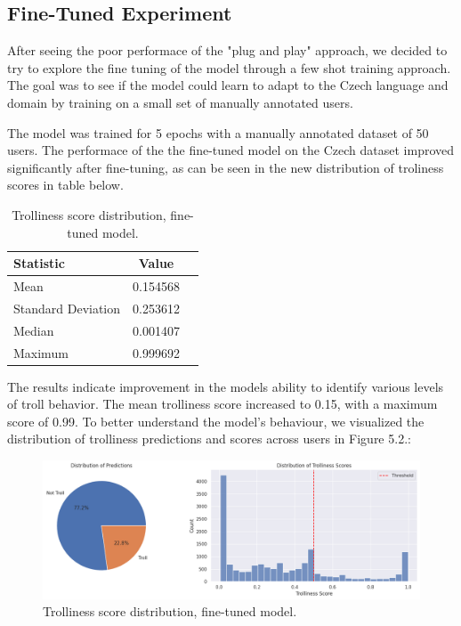 \documentclass[twoside]{ctuthesis}
\theoremstyle{plain}
\theoremstyle{definition}
\theoremstyle{note}
\begin{document}
\subsection{Fine-Tuned Experiment}
After seeing the poor performace of the "plug and play" approach, we decided to try to explore the fine tuning of the model through a few shot training approach. The goal was to see if the model could learn to adapt to the Czech language and domain by training on a small set of manually annotated users.\par
The model was trained for 5 epochs with a manually annotated dataset of 50 users. The performace of the the fine-tuned model on the Czech dataset improved significantly after fine-tuning, as can be seen in the new distribution of troliness scores in table below.

\begin{table}[ht]
    \centering
    \caption{Trolliness score distribution, fine-tuned model.}
    \begin{tabular}{lcc}
        \toprule
        \textbf{Statistic} & \textbf{Value} \\
        \midrule
        Mean & 0.154568  \\
        Standard Deviation & 0.253612 \\
        Median     & 0.001407  \\
        Maximum & 0.999692  \\
        \bottomrule
    \end{tabular}
\end{table}

The results indicate improvement in the models ability to identify various levels of troll behavior. The mean trolliness score increased to 0.15, with a maximum score of 0.99. To better understand the model's behaviour, we visualized the distribution of trolliness predictions and scores across users in Figure 5.2.:\par

\begin{figure}[htbp]
	\centering
	\includegraphics[scale=0.35]{figures/distribution_fine_tuned.png}
	\caption{Trolliness score distribution, fine-tuned model.}
	\label{fig:fine_tune}
\end{figure}
\end{document}

